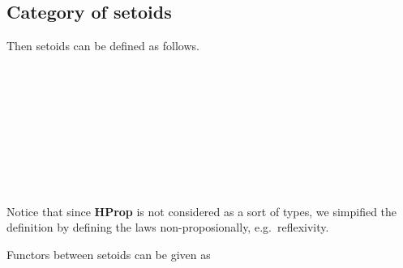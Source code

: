 \subsection{Category of setoids}

Then setoids can be defined as follows.

\begin{code}\>\<%
\\
\>  \AgdaSymbol{:}  \<%
\\
\>[0]\<[2]%
\>[2]\<%
\\
\>[2]\<[4]%
\>[4] \AgdaSymbol{:} \<%
\\
\>[2]\<[4]%
\>[4] \<[13]%
\>[13]\AgdaSymbol{:}     \<%
\\
\>[2]\<[4]%
\>[4] \<[12]%
\>[12]\AgdaSymbol{:} \AgdaSymbol{\{} \AgdaSymbol{:} \AgdaSymbol{\}}  \AgdaFunction{<}    \AgdaFunction{>}\<%
\\
\>[2]\<[4]%
\>[4] \<[12]%
\>[12]\AgdaSymbol{:} \AgdaSymbol{\{}  \AgdaSymbol{:} \AgdaSymbol{\}}  \AgdaFunction{<}    \AgdaFunction{>}  \AgdaFunction{<}    \AgdaFunction{>}\<%
\\
\>[2]\<[4]%
\>[4] \<[12]%
\>[12]\AgdaSymbol{:} \AgdaSymbol{\{}   \AgdaSymbol{:} \AgdaSymbol{\}}  \AgdaFunction{<}    \AgdaFunction{>}  \AgdaFunction{<}    \AgdaFunction{>}  \AgdaFunction{<}    \AgdaFunction{>}\<%
\\
\>\<\end{code}

Notice that since \textbf{HProp} is not considered as a sort of types, we simpified the definition by defining the laws non-proposionally, e.g.\ reflexivity.



Functors between setoids can be given as

